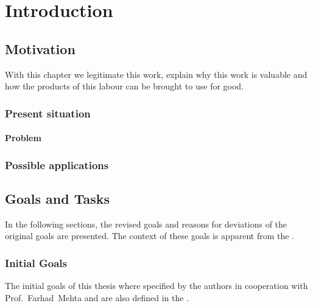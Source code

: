 \chapter{Introduction}
\label{sec:introduction}

\section{Motivation}

With this chapter we legitimate this work, explain why this work is valuable and how the products of this labour can be brought to use for good.

\subsection{Present situation}

\subsubsection{Problem}

\subsection{Possible applications}

\section{Goals and Tasks}
In the following sections, the revised goals and reasons for deviations of the original goals are presented. The context of these goals is apparent from the .

\subsection{Initial Goals}

The initial goals of this thesis where specified by the authors in cooperation with Prof.~Farhad~Mehta and are also defined in the . 

